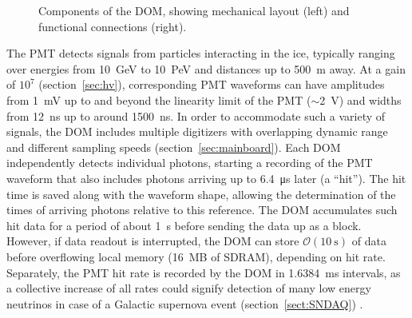 \begin{figure}[!h]
  \captionsetup[subfigure]{labelformat=empty}
  \centering
  \caption{Components of the DOM, showing mechanical layout (left) and functional connections (right).}
  \label{fig:domcomponents}
\end{figure}



The PMT detects signals from particles interacting in the ice, typically ranging over
energies from \qty{10}{GeV} to \qty{10}{PeV} and distances up to \qty{500}{m}
away.  At a gain of $10^7$ (section~\ref{sec:hv}), corresponding PMT waveforms can have amplitudes from \qty{1}{mV} up
to and beyond the linearity limit of the PMT ($\sim$\qty{2}{V}) and widths
from \qty{12}{ns} up to around \qty{1500}{ns}.  In order to accommodate such a variety
of signals, the DOM includes multiple digitizers with overlapping dynamic
range and different sampling speeds
(section~\ref{sec:mainboard}).  Each DOM independently
detects individual photons, starting a recording of
the PMT waveform that also includes photons arriving up to
\qty{6.4}{\micro\second} later (a ``hit'').  The hit time is saved along with the
waveform shape, allowing the determination of the times of arriving photons
relative to this reference.  The DOM accumulates such hit
data for a period of about \qty{1}{s} before sending the data up as a block.
However, if data readout is interrupted, the DOM can store
$\mathcal{O}(\SI{10}{\second})$ of data before overflowing local memory
(16~MB of SDRAM), depending on hit rate.  Separately, the PMT hit rate is recorded by
the DOM in \qty{1.6384}{ms} intervals, as a collective increase of all rates
could signify detection of many low energy neutrinos in case of a Galactic
supernova event (section~\ref{sect:SNDAQ}) \cite{IC3:supernova}.

